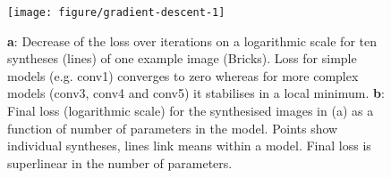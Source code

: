 \documentclass[article, 11pt,a4paper,natbib]{apa6}\usepackage[]{graphicx}\usepackage[]{color}
\newenvironment{knitrout}{}{} %
\begin{document}
\begin{knitrout}
\color{fgcolor}\begin{figure}
\texttt{[image: figure/gradient-descent-1]} \caption{\textbf{a}: Decrease of the loss over iterations on a logarithmic scale for ten syntheses (lines) of one example image (Bricks). Loss for simple models (e.g. conv1) converges to zero whereas for more complex models (conv3, conv4 and conv5) it stabilises in a local minimum.
              \textbf{b}: Final loss (logarithmic scale) for the synthesised images in (a) as a function of number of parameters in the model. Points show individual syntheses, lines link means within a model. 
              Final loss is superlinear in the number of parameters. }\label{fig:gradient-descent}
\end{figure}


\end{knitrout}

\newpage

\end{document}
